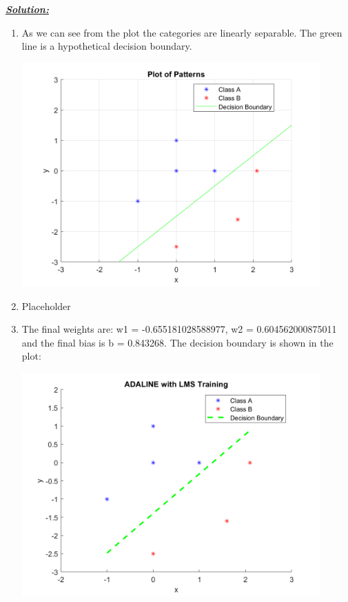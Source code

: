\documentclass{article}
\begin{document}
\noindent \underline{\textbf{\textit{Solution:}}}
\\ 
\begin{enumerate} [label=\Alph*]
  \item As we can see from the plot the categories are linearly separable. The green line is a hypothetical decision boundary.
  \begin{center} \includegraphics[width=0.9\textwidth]{Problem10_A.png} \end{center}
  \item Placeholder
  \item The final weights are: w1 = -0.655181028588977, w2 = 0.604562000875011 
        and the final bias is b = 0.843268. The decision boundary is shown in the plot:
        \begin{center} \includegraphics[width=0.9\textwidth]{Problem10_C.png} \end{center}
\end{enumerate}
\end{document}
